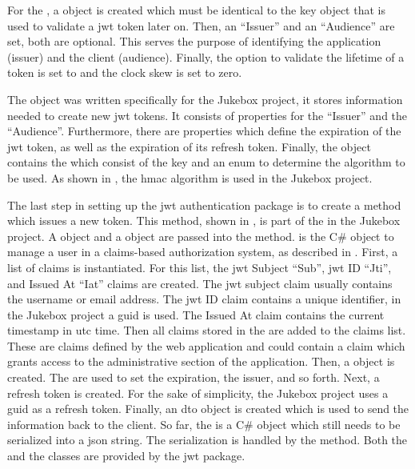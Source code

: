 For the , a  object is created which must be identical to the key object that is used to validate a \gls{jwt} token later on. Then, an \enquote{Issuer} and an \enquote{Audience} are set, both are optional. This serves the purpose of identifying the application (issuer) and the client (audience). Finally, the option to validate the lifetime of a token is set to  and the clock skew is set to zero. \cite{jwtTokenAuth}


The  object was written specifically for the Jukebox project, it stores information needed to create new \gls{jwt} tokens. It consists of properties for the \enquote{Issuer} and the \enquote{Audience}. Furthermore, there are properties which define the expiration of the \gls{jwt} token, as well as the expiration of its refresh token. Finally, the  object contains the  which consist of the key and an enum to determine the algorithm to be used. As shown in , the \gls{hmac} algorithm is used in the Jukebox project.


The last step in setting up the \gls{jwt} authentication package is to create a method which issues a new token. This method, shown in , is part of the  in the Jukebox project. A  object and a  object are passed into the method.  is the C\# object to manage a user in a claims-based authorization system, as described in . First, a list of claims is instantiated. For this list, the \gls{jwt} Subject \enquote{Sub}, \gls{jwt} ID \enquote{Jti}, and Issued At \enquote{Iat} claims are created. The \gls{jwt} subject claim usually contains the username or email address. The \gls{jwt} ID claim contains a unique identifier, in the Jukebox project a \gls{guid} is used. The Issued At claim contains the current timestamp in \gls{utc} time. Then all claims stored in the  are added to the claims list. These are claims defined by the web application and could contain a claim which grants access to the administrative section of the application. Then, a  object is created. The  are used to set the expiration, the issuer, and so forth. Next, a refresh token is created. For the sake of simplicity, the Jukebox project uses a \gls{guid} as a refresh token. Finally, an  \gls{dto} object is created which is used to send the information back to the client. So far, the  is a C\# object which still needs to be serialized into a \gls{json} string. The serialization is handled by the  method. Both the  and the  classes are provided by the \gls{jwt} package.

